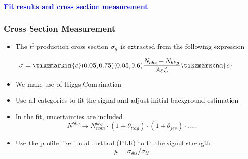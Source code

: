 \documentclass{beamer}
\begin{document}
\begin{frame}
\Huge{\textbf {\textcolor {blue}{Fit results and cross section measurement}}}
\end{frame}
\begin{frame}
\frametitle{Cross Section Measurement}
\begin{itemize}
\item The $t\bar{t}$ production cross section $\sigma_{t\bar{t}}$ is extracted from the following expression
\end{itemize}
\begin{equation}\label{e:barwq3}\begin{split}
\sigma=
\tikzmarkin{c}(0.05,0.75)(0.05,0.6)\frac{N_{obs}-N_{bkg}}{A\varepsilon \mathcal{L}}\tikzmarkend{c}\nonumber
\tikz[remember picture] \node[coordinate] (n1) {};
\end{split}\end{equation}

\begin{itemize}
\item We make use of Higgs Combination 
\item Use all categories to fit the signal and adjust initial background estimation
\item In the fit, uncertainties are included
\begin{equation}
N^{bkg} \rightarrow N_{nom}^{bkg} \cdot (1 +\theta_{btag}) \cdot (1+\theta_{jes}) \cdot ..... \nonumber
\end{equation}
\item Use the profile likelihood method (PLR) to fit the signal strength
\begin{equation}
\mu = \sigma_{obs}/\sigma_{th}\nonumber
\end{equation}
\end{itemize}
\end{frame}
\end{document}
